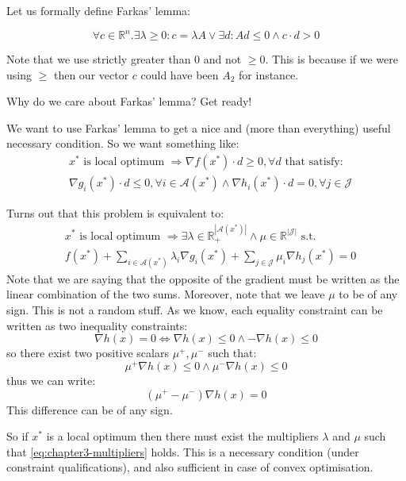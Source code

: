 \par Let us formally define Farkas' lemma:
\begin{theorem}
    \[
        \forall c \in \mathbb{R}^n . \exists \lambda \geq 0 : c = \lambda A \vee \exists d : Ad \leq 0 \wedge c \cdot d > 0
    \]
\end{theorem}
\par Note that we use strictly greater than 0 and not $\geq 0$. This is because if we were using $\geq$ then our vector $c$ could have been $A_2$ for instance.
\par Why do we care about Farkas' lemma? Get ready!
\par We want to use Farkas' lemma to get a nice and (more than everything) useful necessary condition. So we want something like:
\begin{equation}
\begin{split}
    &x^* \mbox{ is local optimum } \Rightarrow \nabla f(x^*) \cdot d \geq 0, \forall d \mbox{ that satisfy: }\\
    &\nabla g_i(x^*) \cdot d \leq 0, \forall i \in \mathcal{A}(x^*) \wedge \nabla h_i(x^*) \cdot d = 0, \forall j \in \mathcal{J}
\end{split}
\end{equation}
\par Turns out that this problem is equivalent to:
\begin{equation}
    \begin{split}
        &x^* \mbox{ is local optimum } \Rightarrow \exists \lambda \in \mathbb{R}_{+}^{|\mathcal{A}(x^*)|} \wedge \mu \in \mathbb{R}^{|\mathcal{J}|} \mbox{ s.t. }\\
        &f(x^*) + \sum_{i \in \mathcal{A}(x^*)} \lambda_i \nabla g_i(x^*) + \sum_{j \in \mathcal{J}} \mu_i \nabla h_j(x^*) = 0
    \end{split}
    \label{eq:chapter3-multipliers}
\end{equation}
Note that we are saying that the opposite of the gradient must be written as the linear combination of the two sums. Moreover, note that we leave $\mu$ to be of any sign. This is not a random stuff. As we know, each equality constraint can be written as two inequality constraints:
\begin{equation}
    \nabla h(x) = 0 \iff \nabla h(x) \leq 0 \wedge -\nabla h(x) \leq 0
\end{equation}
so there exist two positive scalars $\mu^+, \mu^-$ such that:
\begin{equation}
    \mu^+ \nabla h(x) \leq 0 \wedge \mu^- \nabla  h(x) \leq 0
\end{equation}
thus we can write:
\begin{equation}
    (\mu^+ - \mu^-)\nabla h(x) = 0
\end{equation}
This difference can be of any sign.
\par So if $x^*$ is a local optimum then there must exist the multipliers $\lambda$ and $\mu$ such that \ref{eq:chapter3-multipliers} holds. This is a necessary condition (under constraint qualifications), and also sufficient in case of convex optimisation.
%

